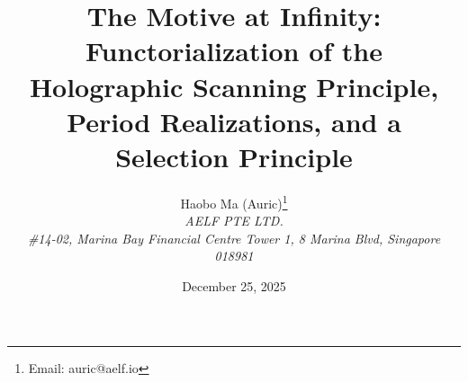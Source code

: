 \documentclass[11pt,a4paper]{article}
\title{The Motive at Infinity:\\ Functorialization of the Holographic Scanning Principle,\\ Period Realizations, and a Selection Principle}
\author{Haobo Ma (Auric)\thanks{Email: auric@aelf.io} \\
\textit{AELF PTE LTD.} \\
\textit{\#14-02, Marina Bay Financial Centre Tower 1, 8 Marina Blvd, Singapore 018981}}
\date{December 25, 2025}
\begin{document}
\maketitle














\FloatBarrier
\appendix


\FloatBarrier

\end{document}
